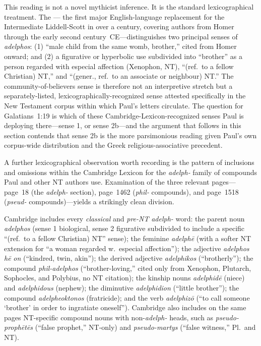 \documentclass[12pt,oneside]{article}
\newcommand{\grk}[1]{\textit{#1}}   %
\begin{document}
This reading is not a novel mythicist inference.  It is the standard
lexicographical treatment.  The \citet{CambridgeGreekLexicon2021}---
the first major English-language replacement for the Intermediate
Liddell-Scott in over a century, covering authors from Homer through
the early second century~CE---distinguishes two principal senses of
\grk{adelphos}: (1) \enquote{male child from the same womb, brother,}
cited from Homer onward; and (2) a figurative or hyperbolic use
subdivided into \enquote{brother} as a person regarded with especial
affection (Xenophon, NT), \enquote{(ref.\ to a fellow Christian) NT,}
and \enquote{(gener., ref.\ to an associate or neighbour) NT.}  The
community-of-believers sense is therefore not an interpretive
stretch but a separately-listed, lexicographically-recognized sense
attested specifically in the New Testament corpus within which
Paul's letters circulate.  The question for Galatians~1:19 is which
of these Cambridge-Lexicon-recognized senses Paul is deploying
there---sense 1, or sense 2b---and the argument that follows in
this section contends that sense 2b is the more parsimonious
reading given Paul's own corpus-wide distribution and the Greek
religious-associative precedent.

A further lexicographical observation worth recording is the
pattern of inclusions and omissions within the Cambridge Lexicon
for the \grk{adelph-} family of compounds Paul and other NT
authors use.  Examination of the three relevant pages---page~18
(the \grk{adelph-} section), page~1462 (\grk{phil-} compounds),
and page~1518 (\grk{pseud-} compounds)---yields a strikingly clean
division.

Cambridge includes every \textit{classical} and
\textit{pre-NT} \grk{adelph-} word: the parent noun \grk{adelphos}
(sense 1 biological, sense 2 figurative subdivided to include a
specific \enquote{(ref.\ to a fellow Christian) NT} sense); the
feminine \grk{adelph\=e} (with a softer NT extension for \enquote
{a woman regarded w.\ especial affection}); the adjective
\grk{adelphos} \grk{h\=e} \grk{on} (\enquote{kindred, twin, akin});
the derived adjective \grk{adelphikos} (\enquote{brotherly}); the
compound \grk{phil-adelphos} (\enquote{brother-loving,} cited only
from Xenophon, Plutarch, Sophocles, and Polybius, no NT citation);
the kinship nouns \grk{adelphid\=e} (niece) and \grk{adelphidous}
(nephew); the diminutive \grk{adelphidion} (\enquote{little
brother}); the compound \grk{adelpheoktonos} (fratricide); and the
verb \grk{adelphiz\=o} (\enquote{to call someone `brother' in order
to ingratiate oneself}).  Cambridge also includes on the same
pages NT-specific compound nouns with non-\grk{adelph-} heads, such
as \grk{pseudo-proph\=et\=es} (\enquote{false prophet,} NT-only) and
\grk{pseudo-martys} (\enquote{false witness,} Pl.\ and NT).
\end{document}
